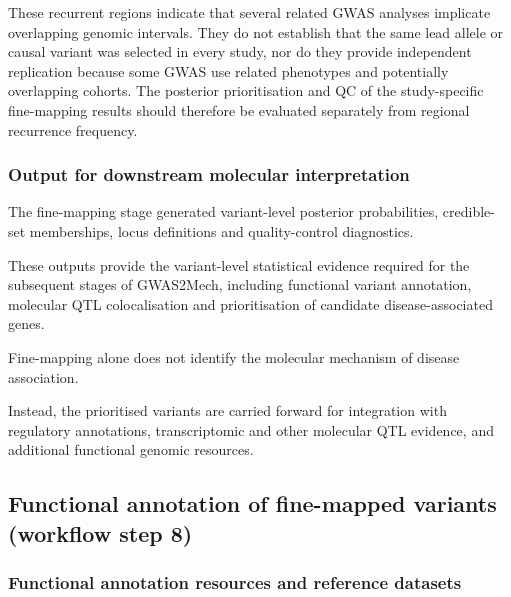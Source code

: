 \documentclass[11pt,a4paper]{article}
\begin{document}
These recurrent regions indicate that several related GWAS analyses
implicate overlapping genomic intervals. They do not establish that
the same lead allele or causal variant was selected in every study,
nor do they provide independent replication because some GWAS use
related phenotypes and potentially overlapping cohorts. The
posterior prioritisation and QC of the study-specific fine-mapping
results should therefore be evaluated separately from regional
recurrence frequency.

\subsubsection{Output for downstream molecular interpretation}

The fine-mapping stage generated variant-level
posterior probabilities, credible-set memberships,
locus definitions and quality-control diagnostics.

These outputs provide the variant-level statistical
evidence required for the subsequent stages of
GWAS2Mech, including functional variant annotation,
molecular QTL colocalisation and prioritisation
of candidate disease-associated genes.

Fine-mapping alone does not identify the molecular
mechanism of disease association.

Instead, the prioritised variants are carried forward
for integration with regulatory annotations,
transcriptomic and other molecular QTL evidence,
and additional functional genomic resources.




%
%

\subsection{Functional annotation of fine-mapped variants (workflow step 8)}
\label{sec:functional_annotation}

\subsubsection{Functional annotation resources and reference datasets}
\label{subsec:annotation_resources}
\end{document}
